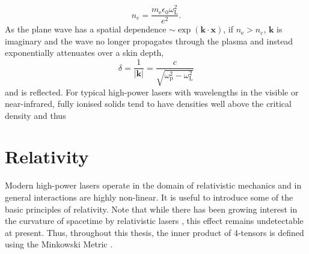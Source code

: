 \begin{equation}
	n_\mathrm{c} = \frac{m_\mathrm{e}\epsilon_0 \omega_\mathrm{L}^2}{e^2}.
\end{equation}
As the plane wave has a spatial dependence $\sim \exp{(\mathbf{k}\cdot\mathbf{x})}$, if $n_\mathrm{e} > n_\mathrm{c}$, $\mathbf{k}$ is imaginary and the wave no longer propagates through the plasma and instead exponentially attenuates over a skin depth,
\begin{equation}
	\delta = \frac{1}{|\mathbf{k}|} = \frac{c}{\sqrt{\omega_\mathrm{p}^2 - \omega_\mathrm{L}^2}}
\end{equation}
and is reflected. For typical high-power lasers with wavelengths in the visible or near-infrared, fully ionised solids tend to have densities well above the critical density and thus 

\section{Relativity}
Modern high-power lasers operate in the domain of relativistic mechanics and in general interactions are highly non-linear. It is useful to introduce some of the basic principles of relativity. Note that while there has been growing interest in the curvature of spacetime by relativistic lasers \cite{atongaGravitationalWavesHighpower2023}, this effect remains undetectable at present. Thus, throughout this thesis, the inner product of 4-tensors is defined using the Minkowski Metric \cite{steaneRelativityMadeRelatively2012}. 

